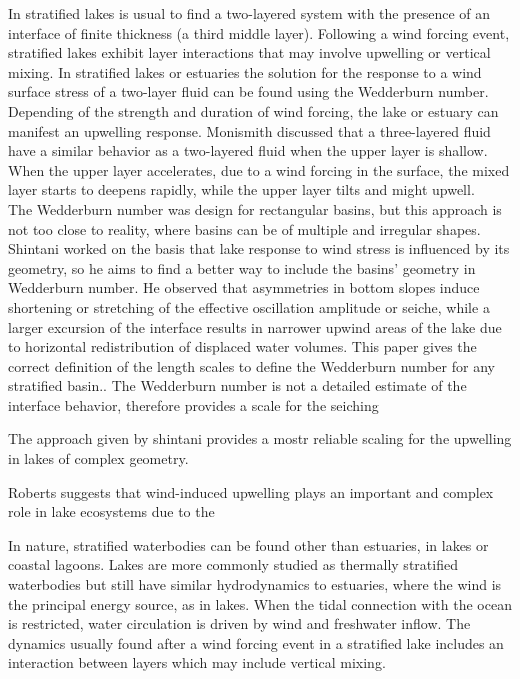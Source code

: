 \documentclass[tesis.tex]{subfiles}
\begin{document}
In stratified lakes is usual to find a two-layered system with the presence of an interface of finite thickness (a third middle layer). 
Following a wind forcing event, stratified lakes exhibit layer interactions that may involve upwelling or vertical mixing. 
In stratified lakes or estuaries the solution for the response to a wind surface stress of a two-layer fluid can be found using the Wedderburn number. 
Depending of the strength and duration of wind forcing, the lake or estuary can manifest an upwelling response. 
Monismith discussed that a three-layered fluid have a similar behavior as a two-layered fluid when the upper layer is shallow. 
When the upper layer accelerates, due to a wind forcing in the surface, the mixed layer starts to deepens rapidly, while the upper layer tilts and might upwell.\\

The Wedderburn number was design for rectangular basins, but this approach is not too close to reality, where basins can be of multiple and irregular shapes. Shintani worked on the basis that lake response to wind stress is influenced by its geometry, so he aims to find a better way to include the basins' geometry in Wedderburn number. He observed that asymmetries in bottom slopes induce shortening or stretching of the effective oscillation amplitude or seiche, while a larger excursion of the interface results in narrower
upwind areas of the lake due to horizontal redistribution of displaced water volumes. This paper gives the correct
definition of the length scales to define the Wedderburn number for any stratified basin.. The Wedderburn number is not a detailed estimate of the interface behavior, therefore provides a scale for the seiching

The approach given by shintani provides a mostr reliable scaling for the upwelling in lakes of complex geometry.

Roberts suggests that wind-induced upwelling plays an important and complex role in lake ecosystems due to the 

In nature, stratified waterbodies can be found other than estuaries, in lakes or coastal lagoons. Lakes are more commonly studied as thermally stratified waterbodies but still have similar hydrodynamics to estuaries, where the wind is the principal energy source, as in lakes. When the tidal connection with the ocean is restricted, water circulation is driven by wind and freshwater inflow. The dynamics usually found after a wind forcing event in a stratified lake includes an interaction between layers which may include vertical mixing. \\
\end{document}
